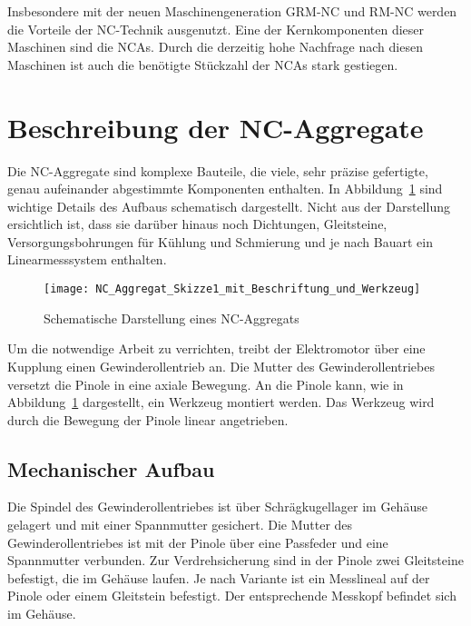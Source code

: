 Insbesondere mit der neuen Maschinengeneration GRM-NC und RM-NC werden die Vorteile der NC-Technik ausgenutzt. Eine der Kernkomponenten dieser Maschinen sind die NCAs. Durch die derzeitig hohe Nachfrage nach diesen Maschinen ist auch die benötigte Stückzahl der NCAs stark gestiegen.





\section{Beschreibung der NC-Aggregate} \label{cha:Beschreibung_der_NCAs}


Die NC-Aggregate sind komplexe Bauteile, die viele, sehr präzise gefertigte, genau aufeinander abgestimmte Komponenten enthalten. In Abbildung~\ref{fig:NCA_Mit_Beschriftung} sind wichtige Details des Aufbaus schematisch dargestellt. Nicht aus der Darstellung ersichtlich ist, dass sie darüber hinaus noch Dichtungen, Gleitsteine, Versorgungsbohrungen für Kühlung und Schmierung und je nach Bauart ein Linearmesssystem  enthalten.


\begin{figure}[H]
\centering
\texttt{[image: NC\_Aggregat\_Skizze1\_mit\_Beschriftung\_und\_Werkzeug]} %
\caption{Schematische Darstellung eines NC-Aggregats}
\label{fig:NCA_Mit_Beschriftung}
\end{figure}


Um die notwendige Arbeit zu verrichten, treibt der Elektromotor über eine Kupplung einen Gewinderollentrieb an. Die Mutter des Gewinderollentriebes versetzt die Pinole in eine axiale Bewegung. An die Pinole kann, wie in Abbildung~\ref{fig:NCA_Mit_Beschriftung} dargestellt, ein Werkzeug montiert werden. Das Werkzeug wird durch die Bewegung der Pinole linear angetrieben.



\subsection{Mechanischer Aufbau}

Die Spindel des Gewinderollentriebes ist über Schrägkugellager im Gehäuse gelagert und mit einer Spannmutter gesichert. Die Mutter des Gewinderollentriebes ist mit der Pinole über eine Passfeder und eine Spannmutter verbunden. Zur Verdrehsicherung sind in der Pinole zwei Gleitsteine befestigt, die im Gehäuse laufen. Je nach Variante ist ein Messlineal auf der Pinole oder einem Gleitstein befestigt. Der entsprechende Messkopf befindet sich im Gehäuse.

